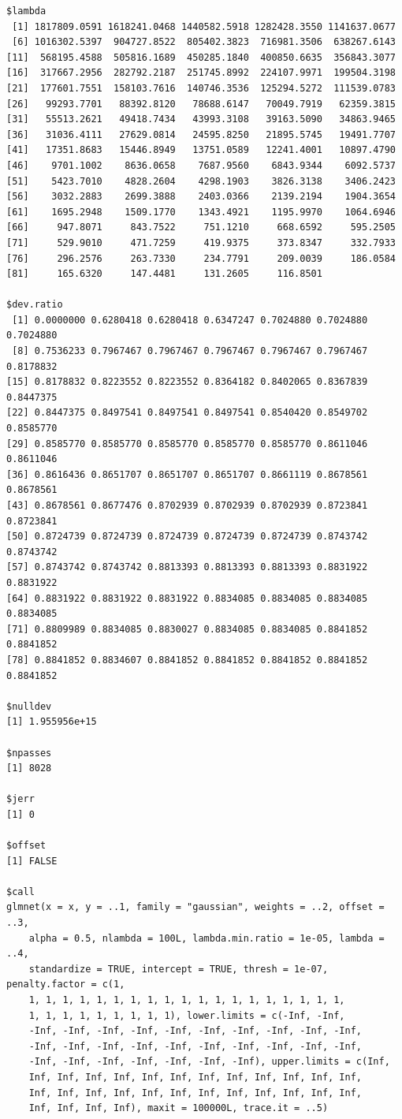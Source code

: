 \documentclass[
]{article}
\begin{document}
\begin{verbatim}
$lambda
 [1] 1817809.0591 1618241.0468 1440582.5918 1282428.3550 1141637.0677
 [6] 1016302.5397  904727.8522  805402.3823  716981.3506  638267.6143
[11]  568195.4588  505816.1689  450285.1840  400850.6635  356843.3077
[16]  317667.2956  282792.2187  251745.8992  224107.9971  199504.3198
[21]  177601.7551  158103.7616  140746.3536  125294.5272  111539.0783
[26]   99293.7701   88392.8120   78688.6147   70049.7919   62359.3815
[31]   55513.2621   49418.7434   43993.3108   39163.5090   34863.9465
[36]   31036.4111   27629.0814   24595.8250   21895.5745   19491.7707
[41]   17351.8683   15446.8949   13751.0589   12241.4001   10897.4790
[46]    9701.1002    8636.0658    7687.9560    6843.9344    6092.5737
[51]    5423.7010    4828.2604    4298.1903    3826.3138    3406.2423
[56]    3032.2883    2699.3888    2403.0366    2139.2194    1904.3654
[61]    1695.2948    1509.1770    1343.4921    1195.9970    1064.6946
[66]     947.8071     843.7522     751.1210     668.6592     595.2505
[71]     529.9010     471.7259     419.9375     373.8347     332.7933
[76]     296.2576     263.7330     234.7791     209.0039     186.0584
[81]     165.6320     147.4481     131.2605     116.8501

$dev.ratio
 [1] 0.0000000 0.6280418 0.6280418 0.6347247 0.7024880 0.7024880 0.7024880
 [8] 0.7536233 0.7967467 0.7967467 0.7967467 0.7967467 0.7967467 0.8178832
[15] 0.8178832 0.8223552 0.8223552 0.8364182 0.8402065 0.8367839 0.8447375
[22] 0.8447375 0.8497541 0.8497541 0.8497541 0.8540420 0.8549702 0.8585770
[29] 0.8585770 0.8585770 0.8585770 0.8585770 0.8585770 0.8611046 0.8611046
[36] 0.8616436 0.8651707 0.8651707 0.8651707 0.8661119 0.8678561 0.8678561
[43] 0.8678561 0.8677476 0.8702939 0.8702939 0.8702939 0.8723841 0.8723841
[50] 0.8724739 0.8724739 0.8724739 0.8724739 0.8724739 0.8743742 0.8743742
[57] 0.8743742 0.8743742 0.8813393 0.8813393 0.8813393 0.8831922 0.8831922
[64] 0.8831922 0.8831922 0.8831922 0.8834085 0.8834085 0.8834085 0.8834085
[71] 0.8809989 0.8834085 0.8830027 0.8834085 0.8834085 0.8841852 0.8841852
[78] 0.8841852 0.8834607 0.8841852 0.8841852 0.8841852 0.8841852 0.8841852

$nulldev
[1] 1.955956e+15

$npasses
[1] 8028

$jerr
[1] 0

$offset
[1] FALSE

$call
glmnet(x = x, y = ..1, family = "gaussian", weights = ..2, offset = ..3, 
    alpha = 0.5, nlambda = 100L, lambda.min.ratio = 1e-05, lambda = ..4, 
    standardize = TRUE, intercept = TRUE, thresh = 1e-07, penalty.factor = c(1, 
    1, 1, 1, 1, 1, 1, 1, 1, 1, 1, 1, 1, 1, 1, 1, 1, 1, 1, 1, 
    1, 1, 1, 1, 1, 1, 1, 1, 1), lower.limits = c(-Inf, -Inf, 
    -Inf, -Inf, -Inf, -Inf, -Inf, -Inf, -Inf, -Inf, -Inf, -Inf, 
    -Inf, -Inf, -Inf, -Inf, -Inf, -Inf, -Inf, -Inf, -Inf, -Inf, 
    -Inf, -Inf, -Inf, -Inf, -Inf, -Inf, -Inf), upper.limits = c(Inf, 
    Inf, Inf, Inf, Inf, Inf, Inf, Inf, Inf, Inf, Inf, Inf, Inf, 
    Inf, Inf, Inf, Inf, Inf, Inf, Inf, Inf, Inf, Inf, Inf, Inf, 
    Inf, Inf, Inf, Inf), maxit = 100000L, trace.it = ..5)


\end{verbatim}
\end{document}
